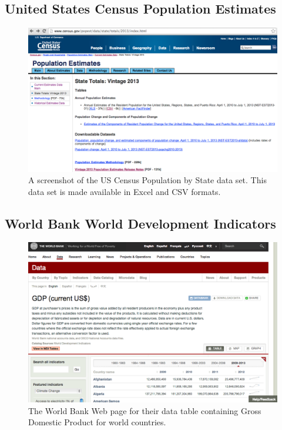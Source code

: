 \subsection{United States Census Population Estimates}
\begin{figure}[h]
  \caption{A screenshot of the US Census Population by State data set. This data set is made available in Excel and CSV formats.}
  \centering
  \includegraphics[width=\textwidth]{figures/usCensusPopulationByState.png}
\end{figure}

\subsection{World Bank World Development Indicators}
\begin{figure}[h]
  \caption{The World Bank Web page for their data table containing Gross Domestic Product for world countries.}
  \centering
  \includegraphics[width=\textwidth]{figures/worldBankGDP.png}
\end{figure}

